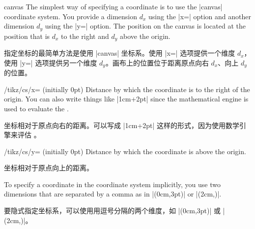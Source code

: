 \begin{coordinatesystem}{canvas}
    The simplest way of specifying a coordinate is to use the |canvas|
    coordinate system. You provide a dimension $d_x$ using the |x=| option and
    another dimension $d_y$ using the |y=| option. The position on the canvas
    is located at the position that is $d_x$ to the right and $d_y$ above the
    origin.

    指定坐标的最简单方法是使用 |canvas| 坐标系。使用 |x=| 选项提供一个维度 $d_x$，使用 |y=| 选项提供另一个维度 $d_y$。画布上的位置位于距离原点向右 $d_x$、向上 $d_y$ 的位置。

    \begin{key}{/tikz/cs/x= (initially 0pt)}
        Distance by which the coordinate is to the right of the origin. You can
        also write things like |1cm+2pt| since the mathematical engine is used
        to evaluate the .

        坐标相对于原点向右的距离。可以写成 |1cm+2pt| 这样的形式，因为使用数学引擎来评估 。
    \end{key}

    \begin{key}{/tikz/cs/y= (initially 0pt)}
        Distance by which the coordinate is above the origin.

        坐标相对于原点向上的距离。
    \end{key}

\begin{codeexample}[]
\end{codeexample}

    To specify a coordinate in the coordinate system implicitly, you use two
    dimensions that are separated by a comma as in |(0cm,3pt)| or
    |(2cm,\textheight)|.
    
    
    要隐式指定坐标系，可以使用用逗号分隔的两个维度，如 |(0cm,3pt)| 或 |(2cm,\textheight)|。%
\begin{codeexample}[]
\end{codeexample}
\end{coordinatesystem}

